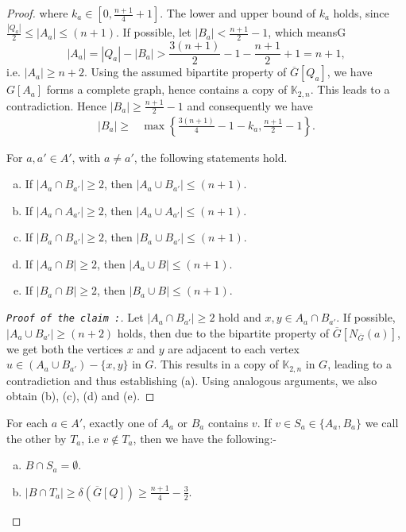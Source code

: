 \documentclass[reqno,10pt]{amsart}
\theoremstyle{definition}
\begin{document}
\begin{proof}
where $k_{a}\in [0, \frac{n+1}{4}+1]$. The lower and upper bound of $k_{a}$ holds, since $\frac{|Q_{a}|}{2}\leq|A_{a}|\leq (n+1)$. If possible, let $|B_{a}|<\frac{n+1}{2}-1$, which meansG
\begin{equation*}
|A_{a}|=|Q_{a}|-|B_{a}|>\frac{3(n+1)}{2}-1-\frac{n+1}{2}+1=n+1,  
\end{equation*}
i.e. $|A_{a}|\geq n+2$. Using the assumed bipartite property of $\overline{G}[Q_{a}]$, we have $G[A_{a}]$ forms a complete graph, hence contains a copy of $\mathbb{K}_{2,n}$. This leads to a contradiction. Hence $|B_{a}|\geq\frac{n+1}{2}-1$ and consequently we have 
\begin{align*}
|B_{a}|\geq&\max\left\{\frac{3(n+1)}{4}-1-k_{a},\frac{n+1}{2}-1\right\}.    
\end{align*}

 For $a,a'\in A'$, with $a\neq a'$, the following statements hold.
\begin{enumerate}[(a)]
\item If  $|A_{a}\cap B_{a'}|\geq 2$, then $|A_{a}\cup B_{a'}|\leq (n+1)$.
\item If  $|A_{a}\cap A_{a'}|\geq 2$, then $|A_{a}\cup A_{a'}|\leq (n+1)$.
\item If  $|B_{a}\cap B_{a'}|\geq 2$, then $|B_{a}\cup B_{a'}|\leq (n+1)$.
\item If  $|A_{a}\cap B|\geq 2$, then $|A_{a}\cup B|\leq (n+1)$.
\item If  $|B_{a}\cap B|\geq 2$, then $|B_{a}\cup B|\leq (n+1)$.
\end{enumerate}

\begin{proof}[\tt{Proof of the claim} :]\renewcommand{\qedsymbol}{}
Let $|A_{a}\cap B_{a'}|\geq 2$ hold and $x,y\in A_{a}\cap B_{a'}$. If possible, $|A_{a}\cup B_{a'}|\geq (n+2)$ holds, then due to the bipartite property of $\overline{G}[N_{\overline{G}}(a)]$, we get both the vertices  $x$ and $y$  are adjacent to each vertex $u\in (A_{a}\cup B_{a'})- \{x,y\}$ in $G$. This results in a copy of $\mathbb{K}_{2,n}$ in $G$, leading to a contradiction and thus establishing (a). Using analogous arguments, we also obtain (b), (c), (d) and (e).
\end{proof}

  For each $a\in A'$,  exactly one of $A_{a}$ or $B_{a}$ contains $v$. If $v\in S_{a}\in\{A_{a},B_{a}\}$ we call the other by $T_{a}$, i.e $v\notin T_{a}$,  then  we have the following:-
\begin{enumerate}[(a)]
\item $B\cap S_{a}=\emptyset$.
\item $|B\cap T_{a}|\geq\delta(\overline{G}[Q])\geq\frac{n+1}{4}-\frac{3}{2}$.


\end{enumerate}
\end{proof}
\end{document}

